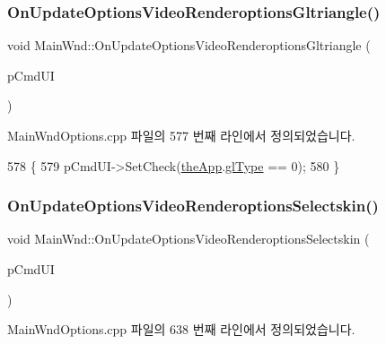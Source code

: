 \subsubsection{\texorpdfstring{On\+Update\+Options\+Video\+Renderoptions\+Gltriangle()}{OnUpdateOptionsVideoRenderoptionsGltriangle()}}
{\footnotesize\ttfamily void Main\+Wnd\+::\+On\+Update\+Options\+Video\+Renderoptions\+Gltriangle (\begin{DoxyParamCaption}\item[{C\+Cmd\+UI $\ast$}]{p\+Cmd\+UI }\end{DoxyParamCaption})\hspace{0.3cm}{\ttfamily [protected]}}



Main\+Wnd\+Options.\+cpp 파일의 577 번째 라인에서 정의되었습니다.


\begin{DoxyCode}
578 \{
579   pCmdUI->SetCheck(\mbox{\hyperlink{_v_b_a_8cpp_a8095a9d06b37a7efe3723f3218ad8fb3}{theApp}}.\mbox{\hyperlink{class_v_b_a_afb5faab6c2ddf2661b2fe19f118fd882}{glType}} == 0);
580 \}
\end{DoxyCode}
\mbox{\label{class_main_wnd_a313b7202736612b30754e6b321246f28}} 
\subsubsection{\texorpdfstring{On\+Update\+Options\+Video\+Renderoptions\+Selectskin()}{OnUpdateOptionsVideoRenderoptionsSelectskin()}}
{\footnotesize\ttfamily void Main\+Wnd\+::\+On\+Update\+Options\+Video\+Renderoptions\+Selectskin (\begin{DoxyParamCaption}\item[{C\+Cmd\+UI $\ast$}]{p\+Cmd\+UI }\end{DoxyParamCaption})\hspace{0.3cm}{\ttfamily [protected]}}



Main\+Wnd\+Options.\+cpp 파일의 638 번째 라인에서 정의되었습니다.


